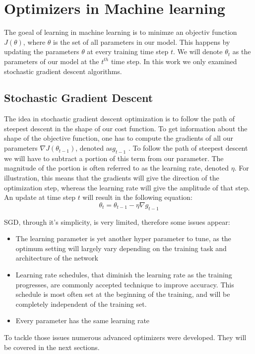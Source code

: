 {\iffalse
\section{Optimizers in Machine learning} \label{optimizers}
The goeal of learning in machine learning is to minimze an objectiv function  $J(\theta)$, where $\theta$ is the set of all parameters in our model. This happens by updating the parameters $\theta$ at every training time step $t$. We will denote $\theta_{t}$ as the parameters of our model at the $t^{th}$ time step. In this work we only examined stochastic gradient descent algorithms.
\subsection{Stochastic Gradient Descent}
The idea in stochastic gradient descent optimization is to follow the path of steepest descent in the shape of our cost function. To get information about the shape of the objective function, one has to compute the gradients of all our parameters $  \nabla J(\theta_{t-1})$, denoted as$g_{t-1}$ . To follow the path of steepest descent we will have to subtract a portion of this term from our parameter. The magnitude of the portion is often referred to as the learning rate, denoted $\eta$. For illustration, this means that the gradients will give the direction of the optimization step, whereas the learning rate will give the amplitude of that step. An update at time step $t$ will result in the following equation:
\begin{equation}
\theta_t = \theta_{t-1} - \eta \nabla g_{t-1}
\end{equation}

SGD, through it's simplicity, is very limited, therefore some issues appear:

\begin{itemize}
\item The learning parameter is yet another hyper parameter to tune, as the optimum setting will largely vary depending on the training task and architecture of the network
\item Learning rate schedules, that diminish the learning rate as the training progresses, are commonly accepted technique to improve accuracy. This schedule is most often set at the beginning of the training, and will be completely independent of the training set. 
\item Every parameter has the same learning rate
\end{itemize}
To tackle those issues numerous advanced optimizers were developed. They will be covered in the next sections. 

}
